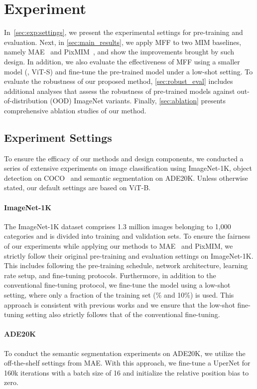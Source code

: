 \section{Experiment}
In~\autoref{sec:exp:settings}, we present the experimental settings for pre-training and evaluation. Next, in \autoref{sec:main_results}, we apply MFF to two MIM baselines, namely MAE~\cite{MAE} and PixMIM~\cite{pixmim}, and show the improvements brought by such design. In addition, we also evaluate the effectiveness of MFF using a smaller model (\eg, ViT-S) and fine-tune the pre-trained model under a low-shot setting. To evaluate the robustness of our proposed method, \autoref{sec:robust_eval} includes additional analyses that assess the robustness of pre-trained models against out-of-distribution (OOD) ImageNet variants. Finally, \autoref{sec:ablation} presents comprehensive ablation studies of our method.


\subsection{Experiment Settings}
\label{sec:exp:settings}
To ensure the efficacy of our methods and design components, we conducted a series of extensive experiments on image classification using ImageNet-1K\cite{ImageNet-1K}, object detection on COCO~\cite{coco} and semantic segmentation on ADE20K\cite{ADE20K}. Unless otherwise stated, our default settings are based on ViT-B.


\paragraph{ImageNet-1K~\cite{ImageNet-1K}} The ImageNet-1K dataset comprises 1.3 million images belonging to 1,000 categories and is divided into training and validation sets. To ensure the fairness of our experiments while applying our methods to MAE~\cite{MAE} and PixMIM\cite{pixmim}, we strictly follow their original pre-training and evaluation settings on ImageNet-1K. This includes following the pre-training schedule, network architecture, learning rate setup, and fine-tuning protocols. Furthermore, in addition to the conventional fine-tuning protocol, we fine-tune the model using a low-shot setting, where only a fraction of the training set (\% and 10\%) is used. This approach is consistent with previous works\cite{simclr} and we ensure that the low-shot fine-tuning setting also strictly follows that of the conventional fine-tuning.

\paragraph{ADE20K~\cite{ADE20K}} To conduct the semantic segmentation experiments on ADE20K, we utilize the off-the-shelf settings from MAE\cite{MAE}. With this approach, we fine-tune a UperNet\cite{upernet} for 160k iterations with a batch size of 16 and initialize the relative position bias to zero. 

